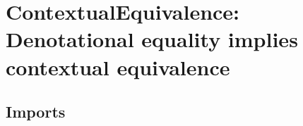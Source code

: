 \hypertarget{ContextualEquivalence}{%
\chapter{ContextualEquivalence: Denotational equality implies contextual
equivalence}\label{ContextualEquivalence}}

\begin{fence}
\begin{code}%
\>[0]\AgdaSpace{}%
\AgdaSpace{}%
\<%
\end{code}
\end{fence}

\hypertarget{imports}{%
\section{Imports}\label{imports}}

